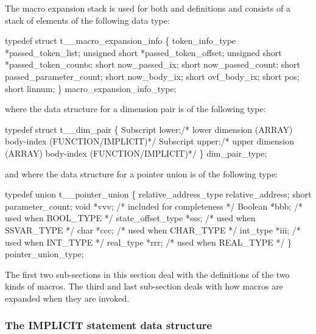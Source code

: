 The macro expansion stack is used for both  and 
definitions and consists of a stack of elements of the
following data type:
\begin{codeexample}
typedef struct t__macro_expansion_info
   \{
       token_info_type *passed_token_list;
       unsigned short *passed_token_offset;
       unsigned short *passed_token_counts;
       short now_passed_ix;
       short now_passed_count;
       short passed_parameter_count;
       short now_body_ix;
       short ovf_body_ix;
       short pos;
       short linnum;
   \} macro_expansion_info_type;
\end{codeexample}
where the data structure for a dimension pair is of the following type:
\begin{codeexample}
typedef struct t__dim_pair
  \{
    Subscript lower;/* lower dimension (ARRAY) body-index (FUNCTION/IMPLICIT)*/
    Subscript upper;/* upper dimension (ARRAY) body-index (FUNCTION/IMPLICIT)*/
  \} dim_pair_type;
\end{codeexample}

and where the data structure for a pointer union is of the following type:
\begin{codeexample}
typedef union t__pointer_union
   \{
     relative_address_type relative_address;
     short parameter_count;
     void *vvv;               /* included for completeness */
     Boolean *bbb;            /* used when BOOL_TYPE */
     state_offset_type *sss;  /* used when SSVAR_TYPE */
     char *ccc;               /* used when CHAR_TYPE */
     int_type *iii;           /* used when INT_TYPE */
     real_type *rrr;          /* used when REAL_TYPE */
   \} pointer_union_type;
\end{codeexample}



The first two sub-sections in this section deal with the definitions of
the two kinds of macros.  The third and last sub-section deals with how
macros are expanded when they are invoked.

\subsubsection{The IMPLICIT statement data structure}
\label{sec:implicit}

